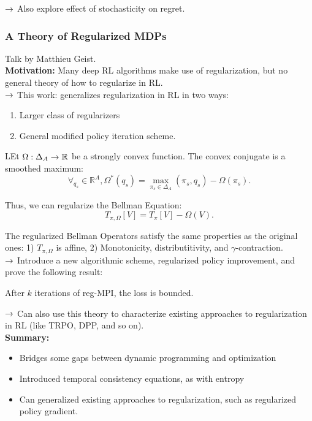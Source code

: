 $\rightarrow$ Also explore effect of stochasticity on regret. \\

\spacerule

\subsubsection{A Theory of Regularized MDPs}

Talk by Matthieu Geist. \\

{\bf Motivation:} Many deep RL algorithms make use of regularization, but no general theory of how to regularize in RL. \\

$\rightarrow$ This work: generalizes regularization in RL in two ways:
\begin{enumerate}
    \item Larger class of regularizers
    \item General modified policy iteration scheme.
\end{enumerate}

LEt $\Omega : \Delta_A \rightarrow \mathbb{R}$ be a strongly convex function. The convex conjugate is a smoothed maximum:
\[
\forall_{q_s} \in \mathbb{R}^A, \Omega^*(q_s) = \max_{\pi_s \in \Delta_A} (\pi_s, q_s) - \Omega(\pi_s).
\]

Thus, we can regularize the Bellman Equation:
\begin{equation}
    T_{\pi,\Omega}[V] = T_\pi[V] - \Omega(V).
\end{equation}

The regularized Bellman Operators satisfy the same properties as the original ones: 1) $T_{\pi, \Omega}$ is affine, 2) Monotonicity, distributitivity, and $\gamma$-contraction. \\

$\rightarrow$ Introduce a new algorithmic scheme, regularized policy improvement, and prove the following result:

\begin{theorem}
After $k$ iterations of reg-MPI, the loss is bounded.
\end{theorem}

$\rightarrow$ Can also use this theory to characterize existing approaches to regularization in RL (like TRPO, DPP, and so on). \\

{\bf Summary:}
\begin{itemize}
    \item Bridges some gaps between dynamic programming and optimization
    \item Introduced temporal consistency equations, as with entropy
    \item Can generalized existing approaches to regularization, such as regularized policy gradient.
\end{itemize}


